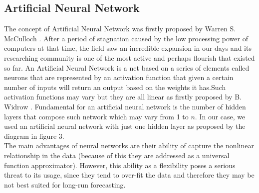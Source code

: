\documentclass[twocolumn]{article}
\begin{document}
\subsection{Artificial Neural Network}
The concept of Artificial Neural Network was firstly proposed by Warren S. McCulloch \cite{mcculloch_logical_1943}.
After a period of stagnation caused by the low processing power of computers at that time, the field saw an incredible expansion in our days and its researching community is one of the most active and perhaps flourish that existed so far.
An Artificial Neural Network is a net based on a series of elements called neurons that are represented by an activation function that given a certain number of inputs will return an output based on the weights it has.Such activation functions may vary but they are all linear as firstly proposed by B. Widrow \cite{b._widrow_et_al._adaptive_}.
Fundamental for an artificial neural network is the number of hidden layers that compose such network which may vary from 1 to $n$. In our case, we used an artificial neural network with just one hidden layer as proposed by the diagram in figure 3.
\\
The main advantages of neural networks are their ability of capture the nonlinear relationship in the data (because of this they are addressed as a universal function approximator). However, this ability as a flexibility poses a serious threat to its usage, since they tend to over-fit the data and therefore they may be not best suited for long-run forecasting\cite{rud_data_2001}.

\end{document}

